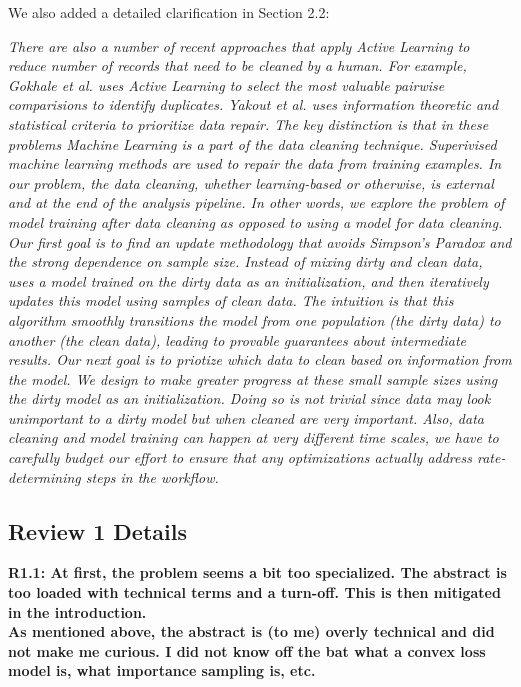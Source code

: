 \vspace{0.5em}

We also added a detailed clarification in Section 2.2:

\vspace{0.5em}

\emph{There are also a number of recent approaches that apply Active Learning to reduce number of records that need to be cleaned by a human.
For example, Gokhale et al. \cite{gokhale2014corleone} uses Active Learning to select the most valuable pairwise comparisions to identify duplicates.
Yakout et al. \cite{yakout2013don,DBLP:journals/pvldb/YakoutENOI11} uses information theoretic and statistical criteria to prioritize data repair.
The key distinction is that in these problems Machine Learning is a part of the data cleaning technique.
Superivised machine learning methods are used to repair the data from training examples.
In our problem, the data cleaning, whether learning-based or otherwise, is external and at the end of the analysis pipeline.
In other words, we explore the problem of model training \emph{after} data cleaning as opposed to using a model \emph{for} data cleaning.\\
Our first goal is to find an update methodology that avoids Simpson's Paradox and the strong dependence on sample size.
Instead of mixing dirty and clean data, \sys uses a model trained on the dirty data as an initialization, and then iteratively updates this model using samples of clean data.
The intuition is that this algorithm smoothly transitions the model from one population (the dirty data) to another (the clean data), leading to provable guarantees about intermediate results.
Our next goal is to priotize which data to clean based on information from the model.
We design \sys to make greater progress at these small sample sizes using the dirty model as an initialization.
Doing so is not trivial since data may look unimportant to a dirty model but when cleaned are very important.
Also, data cleaning and model training can happen at very different time scales, we have to carefully budget our effort to ensure that any optimizations actually address rate-determining steps in the workflow.}

\subsection*{Review 1 Details} 

\noindent\textbf{R1.1: At first, the problem seems a bit too specialized. The abstract is too loaded with technical terms and a turn-off. This is then mitigated in the introduction. \\
As mentioned above, the abstract is (to me) overly technical and did not make me curious. I did not know off the bat what a convex loss model is, what importance sampling is, etc.}

